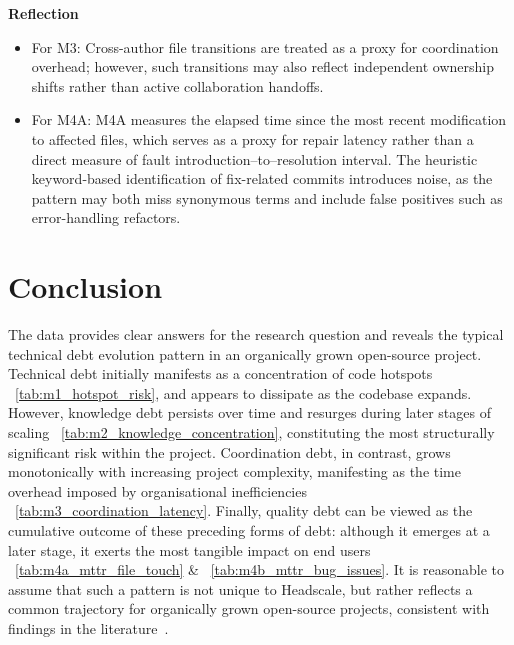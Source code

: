 \documentclass[11pt, a4paper]{article}
\begin{document}
\textbf{Reflection}
\begin{itemize}
    \item For M3: Cross-author file transitions are treated as a proxy for coordination overhead; however, such transitions may also reflect independent ownership shifts rather than active collaboration handoffs.
    \item For M4A: M4A measures the elapsed time since the most recent modification to affected files, which serves as a proxy for repair latency rather than a direct measure of fault introduction–to–resolution interval. The heuristic keyword-based identification of fix-related commits introduces noise, as the pattern may both miss synonymous terms and include false positives such as error-handling refactors.
\end{itemize}



\section{Conclusion}

The data provides clear answers for the research question and reveals the typical technical debt evolution pattern in an organically grown open-source project. Technical debt initially manifests as a concentration of code hotspots ~\cref{tab:m1_hotspot_risk}, and appears to dissipate as the codebase expands. However, knowledge debt persists over time and resurges during later stages of scaling ~\cref{tab:m2_knowledge_concentration}, constituting the most structurally significant risk within the project. Coordination debt, in contrast, grows monotonically with increasing project complexity, manifesting as the time overhead imposed by organisational inefficiencies ~\cref{tab:m3_coordination_latency}. Finally, quality debt can be viewed as the cumulative outcome of these preceding forms of debt: although it emerges at a later stage, it exerts the most tangible impact on end users ~\cref{tab:m4a_mttr_file_touch} \& ~\cref{tab:m4b_mttr_bug_issues}. It is reasonable to assume that such a pattern is not unique to Headscale, but rather reflects a common trajectory for organically grown open-source projects, consistent with findings in the literature~\cite{coelho_why_2017}. 


\newpage
\printbibliography[heading=bibintoc]
\end{document}
